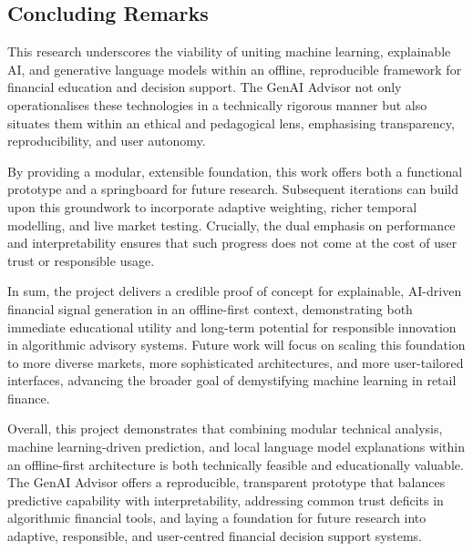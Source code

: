 \subsection{Concluding Remarks}

This research underscores the viability of uniting machine learning, explainable AI, and generative language models within an offline, reproducible framework for financial education and decision support. The GenAI Advisor not only operationalises these technologies in a technically rigorous manner but also situates them within an ethical and pedagogical lens, emphasising transparency, reproducibility, and user autonomy.

By providing a modular, extensible foundation, this work offers both a functional prototype and a springboard for future research. Subsequent iterations can build upon this groundwork to incorporate adaptive weighting, richer temporal modelling, and live market testing. Crucially, the dual emphasis on performance and interpretability ensures that such progress does not come at the cost of user trust or responsible usage.

In sum, the project delivers a credible proof of concept for explainable, AI-driven financial signal generation in an offline-first context, demonstrating both immediate educational utility and long-term potential for responsible innovation in algorithmic advisory systems. Future work will focus on scaling this foundation to more diverse markets, more sophisticated architectures, and more user-tailored interfaces, advancing the broader goal of demystifying machine learning in retail finance.

Overall, this project demonstrates that combining modular technical analysis, machine learning-driven prediction, and local language model explanations within an offline-first architecture is both technically feasible and educationally valuable. The GenAI Advisor offers a reproducible, transparent prototype that balances predictive capability with interpretability, addressing common trust deficits in algorithmic financial tools, and laying a foundation for future research into adaptive, responsible, and user-centred financial decision support systems.